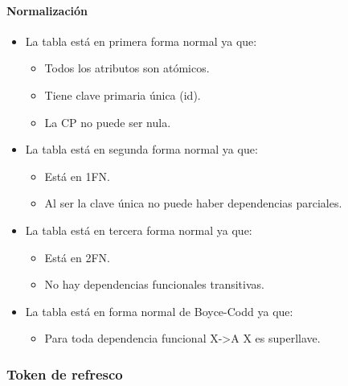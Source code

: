 \documentclass[12pt,a4paperpaper,]{report}
\providecommand{\tightlist}{%
  \setlength{\itemsep}{0pt}\setlength{\parskip}{0pt}}
\let\oldparagraph\paragraph
\renewcommand{\paragraph}[1]{\oldparagraph{#1}\mbox{}}
\begin{document}
\paragraph{Normalización}\label{normalizaciuxf3n-5}

\begin{itemize}
\tightlist
\item
  La tabla está en primera forma normal ya que:

  \begin{itemize}
  \tightlist
  \item
    Todos los atributos son atómicos.
  \item
    Tiene clave primaria única (id).
  \item
    La CP no puede ser nula.
  \end{itemize}
\item
  La tabla está en segunda forma normal ya que:

  \begin{itemize}
  \tightlist
  \item
    Está en 1FN.
  \item
    Al ser la clave única no puede haber dependencias parciales.
  \end{itemize}
\item
  La tabla está en tercera forma normal ya que:

  \begin{itemize}
  \tightlist
  \item
    Está en 2FN.
  \item
    No hay dependencias funcionales transitivas.
  \end{itemize}
\item
  La tabla está en forma normal de Boyce-Codd ya que:

  \begin{itemize}
  \tightlist
  \item
    Para toda dependencia funcional X-\textgreater{}A X es superllave.
  \end{itemize}
\end{itemize}

\subsubsection{Token de refresco}\label{token-de-refresco}
\end{document}
